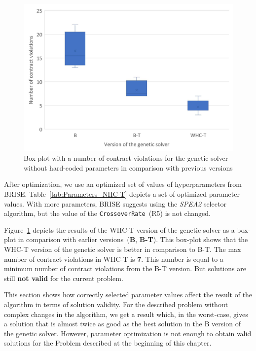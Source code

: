 \begin{figure}[!htb]
	\centering
	\includegraphics[width=\textwidth]{images/BoxPlotSolverNoHardcodedTuning.pdf}
	\caption[Box-plot with a number of contract violations for the genetic solver without hard-coded parameters in comparison with previous versions]{Box-plot with a number of contract violations for the genetic solver without hard-coded parameters in comparison with previous versions}
	\label{fig:boxplotsolverNoHardcodedTuning}
\end{figure}


After optimization, we use an optimized set of values of hyperparameters from BRISE. Table~\ref{tab:Parameters_NHC-T} depicts a set of optimized parameter values. With more parameters, BRISE suggests using the \textit{SPEA2} selector algorithm, but the value of the \texttt{CrossoverRate}~(R5) is not changed.



Figure~\ref{fig:boxplotsolverNoHardcodedTuning} depicts the results of the WHC-T version of the genetic solver as a box-plot in comparison with earlier versions~(\textbf{B}, \textbf{B-T}). This box-plot shows that the WHC-T version of the genetic solver is better in comparison to B-T. The max number of contract violations in WHC-T is \textbf{7}. This number is equal to a minimum number of contract violations from the B-T version. But solutions are still \textbf{not valid} for the current problem. 



This section shows how correctly selected parameter values affect the result of the algorithm in terms of solution validity. For the described problem without complex changes in the algorithm, we get a result which, in the worst-case, gives a solution that is almost twice as good as the best solution in the B version of the genetic solver. However, parameter optimization is not enough to obtain valid solutions for the Problem described at the beginning of this chapter. 

